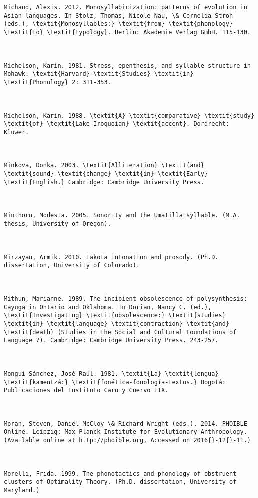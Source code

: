 \begin{verbatim}
Michaud, Alexis. 2012. Monosyllabicization: patterns of evolution in Asian languages. In Stolz, Thomas, Nicole Nau, \& Cornelia Stroh (eds.), \textit{Monosyllables:} \textit{from} \textit{phonology} \textit{to} \textit{typology}. Berlin: Akademie Verlag GmbH. 115-130.



Michelson, Karin. 1981. Stress, epenthesis, and syllable structure in Mohawk. \textit{Harvard} \textit{Studies} \textit{in} \textit{Phonology} 2: 311-353.



Michelson, Karin. 1988. \textit{A} \textit{comparative} \textit{study} \textit{of} \textit{Lake-Iroquoian} \textit{accent}. Dordrecht: Kluwer.



Minkova, Donka. 2003. \textit{Alliteration} \textit{and} \textit{sound} \textit{change} \textit{in} \textit{Early} \textit{English.} Cambridge: Cambridge University Press.



Minthorn, Modesta. 2005. Sonority and the Umatilla syllable. (M.A. thesis, University of Oregon).



Mirzayan, Armik. 2010. Lakota intonation and prosody. (Ph.D. dissertation, University of Colorado).



Mithun, Marianne. 1989. The incipient obsolescence of polysynthesis: Cayuga in Ontario and Oklahoma. In Dorian, Nancy C. (ed.), \textit{Investigating} \textit{obsolescence:} \textit{studies} \textit{in} \textit{language} \textit{contraction} \textit{and} \textit{death} (Studies in the Social and Cultural Foundations of Language 7). Cambridge: Cambridge University Press. 243-257.



Mongui Sánchez, José Raúl. 1981. \textit{La} \textit{lengua} \textit{kamentzá:} \textit{fonética-fonología-textos.} Bogotá: Publicaciones del Instituto Caro y Cuervo LIX.



Moran, Steven, Daniel McCloy \& Richard Wright (eds.). 2014. PHOIBLE Online. Leipzig: Max Planck Institute for Evolutionary Anthropology. (Available online at http://phoible.org, Accessed on 2016{}-12{}-11.)



Morelli, Frida. 1999. The phonotactics and phonology of obstruent clusters of Optimality Theory. (Ph.D. dissertation, University of Maryland.)




\end{verbatim}
